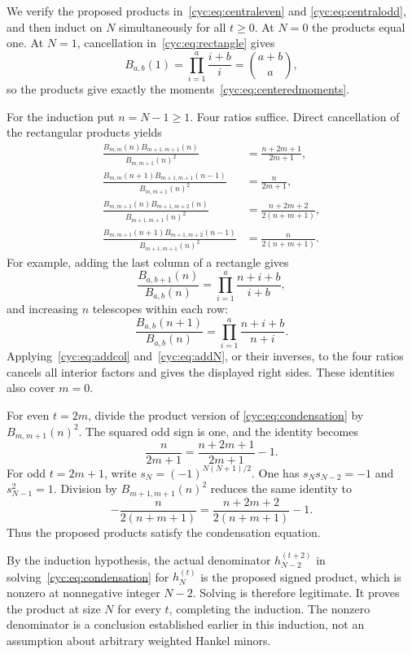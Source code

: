 \documentclass[11pt,a4paper]{article}
\numberwithin{equation}{section}
\theoremstyle{definition}
\theoremstyle{remark}
\begin{document}
We verify the proposed products in~\eqref{cyc:eq:centraleven} and
\eqref{cyc:eq:centralodd}, and then induct on $N$ simultaneously for all
$t\ge0$.  At $N=0$ the products equal one.  At $N=1$, cancellation
in~\eqref{cyc:eq:rectangle} gives
\begin{equation}\label{cyc:eq:B1}
 B_{a,b}(1)=\prod_{i=1}^{a}\frac{i+b}{i}=\binom{a+b}{a},
\end{equation}
so the products give exactly the moments~\eqref{cyc:eq:centeredmoments}.

For the induction put $n=N-1\ge1$.  Four ratios suffice.  Direct
cancellation of the rectangular products yields
\begin{align}
 \frac{B_{m,m}(n)B_{m+1,m+1}(n)}{B_{m,m+1}(n)^2}
 &=\frac{n+2m+1}{2m+1},\label{cyc:eq:rat-even1}\\
 \frac{B_{m,m}(n+1)B_{m+1,m+1}(n-1)}{B_{m,m+1}(n)^2}
 &=\frac{n}{2m+1},\label{cyc:eq:rat-even2}\\
 \frac{B_{m,m+1}(n)B_{m+1,m+2}(n)}{B_{m+1,m+1}(n)^2}
 &=\frac{n+2m+2}{2(n+m+1)},\label{cyc:eq:rat-odd1}\\
 \frac{B_{m,m+1}(n+1)B_{m+1,m+2}(n-1)}{B_{m+1,m+1}(n)^2}
 &=\frac{n}{2(n+m+1)}.\label{cyc:eq:rat-odd2}
\end{align}
For example, adding the last column of a rectangle gives
\begin{equation}\label{cyc:eq:addcol}
 \frac{B_{a,b+1}(n)}{B_{a,b}(n)}
 =\prod_{i=1}^{a}\frac{n+i+b}{i+b},
\end{equation}
and increasing $n$ telescopes within each row:
\begin{equation}\label{cyc:eq:addN}
 \frac{B_{a,b}(n+1)}{B_{a,b}(n)}
 =\prod_{i=1}^{a}\frac{n+i+b}{n+i}.
\end{equation}
Applying~\eqref{cyc:eq:addcol} and~\eqref{cyc:eq:addN}, or their inverses,
to the four ratios cancels all interior factors and gives the displayed
right sides.  These identities also cover $m=0$.

For even $t=2m$, divide the product version of
\eqref{cyc:eq:condensation} by $B_{m,m+1}(n)^2$.  The squared odd sign
is one, and the identity becomes
\[
 \frac n{2m+1}=\frac{n+2m+1}{2m+1}-1.
\]
For odd $t=2m+1$, write $s_N=(-1)^{N(N+1)/2}$.
One has $s_Ns_{N-2}=-1$ and $s_{N-1}^2=1$.  Division by
$B_{m+1,m+1}(n)^2$ reduces the same identity to
\[
 -\frac n{2(n+m+1)}=\frac{n+2m+2}{2(n+m+1)}-1.
\]
Thus the proposed products satisfy the condensation equation.

By the induction hypothesis, the actual denominator
$h_{N-2}^{(t+2)}$ in solving~\eqref{cyc:eq:condensation} for $h_N^{(t)}$
is the proposed signed product, which is nonzero at nonnegative
integer $N-2$.  Solving is therefore legitimate.  It proves the product
at size $N$ for every $t$, completing the induction.  The nonzero
denominator is a conclusion established earlier in this induction,
not an assumption about arbitrary weighted Hankel minors.
\end{document}

